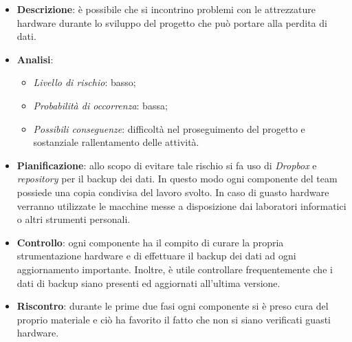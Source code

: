 			\begin{itemize}
				\item \textbf{Descrizione}: è possibile che si incontrino problemi con le attrezzature hardware durante lo sviluppo del progetto che può portare alla perdita di dati.
				\item \textbf{Analisi}:
				\begin{itemize}
					\item \textit{Livello di rischio}: basso;
					\item \textit{Probabilità di occorrenza}: bassa;
					\item \textit{Possibili conseguenze}: difficoltà nel proseguimento del progetto e sostanziale rallentamento delle attività.
				\end{itemize}
				\item \textbf{Pianificazione}: allo scopo di evitare tale rischio si fa uso di \textit{Dropbox} e \textit{repository} per il backup dei dati. In questo modo ogni componente del team possiede una copia condivisa del lavoro svolto. In caso di guasto hardware verranno utilizzate le macchine messe a disposizione dai laboratori informatici o altri strumenti personali.
				\item \textbf{Controllo}: ogni componente ha il compito di curare la propria strumentazione hardware e di effettuare il backup dei dati ad ogni aggiornamento importante. Inoltre, è utile controllare frequentemente che i dati di backup siano presenti ed aggiornati all'ultima versione.
				\item \textbf{Riscontro}: durante le prime due fasi ogni componente si è preso cura del proprio materiale e ciò ha favorito il fatto che non si siano verificati guasti hardware.
			\end{itemize}
